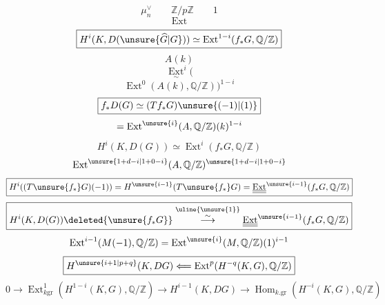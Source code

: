 \[
\mu_n^\vee\qquad\mathbb Z/p\mathbb Z\qquad1
\]
\[
\operatorname{Ext}
\]
\[
\boxed{H^i(K,D(\unsure{\widehat G|G}))\simeq
\operatorname{Ext}^{1-i}(f_*G,\mathbb Q/\mathbb Z)}
\]
\[
A(k)
\]
\[
\underset{\sim}{\operatorname{Ext}}^i(
\]
\[
\operatorname{Ext}^0(A(k),\mathbb Q/\mathbb Z))^{1-i}
\]
\[
\boxed{f_*D(G)\simeq(Tf_*G)\unsure{(-1)|(1)}}
\]
\[
=\operatorname{Ext}^{\unsure{i}}(A,\mathbb Q/\mathbb Z)(k)^{1-i}
\]
\[
H^i(K,D(G))\simeq\operatorname{Ext}^i(f_*G,\mathbb Q/\mathbb Z)
\]
\[
\operatorname{Ext}^{\unsure{1+d-i|1+0-i}}(A,\mathbb Q/\mathbb Z)^{\unsure{1+d-i|1+0-i}}
\]
\[
\boxed{H^i((T\unsure{f_*}G)(-1))=H^{\unsure{i-1}}(T\unsure{f_*}G)
=\underline{\underline{\operatorname{Ext}}}^{\unsure{i-1}}(f_*G,\mathbb Q/\mathbb Z)}
\]
\[
\boxed{H^i(K,D(G))\deleted{\unsure{f_*G}}
\overset{\uline{\unsure{1}}}{\overset{\sim}{\longrightarrow}}
\underline{\underline{\operatorname{Ext}}}^{\unsure{i-1}}(f_*G,\mathbb Q/\mathbb Z)}
\]
\[
\operatorname{Ext}^{i-1}(M(-1),\mathbb Q/\mathbb Z)
=\operatorname{Ext}^{\unsure{i}}(M,\mathbb Q/\mathbb Z)(1)^{i-1}
\]
\[
\boxed{H^{\unsure{i+1|p+q}}(K,DG)\Longleftarrow
\operatorname{Ext}^{p}(H^{-q}(K,G),\mathbb Q/\mathbb Z)}
\]
\[
0\longrightarrow\operatorname{Ext}^{1}_{k\mathrm{gr}}(H^{1-i}(K,G),\mathbb Q/\mathbb Z)
\longrightarrow H^{i-1}(K,DG)\longrightarrow
\operatorname{Hom}_{k.\mathrm{gr}}(H^{-i}(K,G),\mathbb Q/\mathbb Z)
\]

